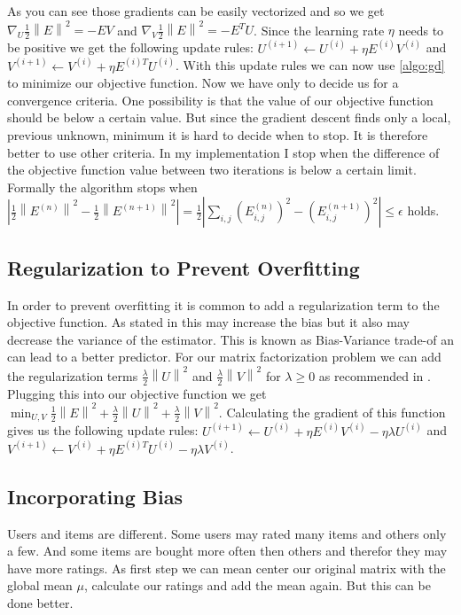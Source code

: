 \documentclass[DIV=14,twocolumn]{scrartcl}
\newcommand{\norm}[1]{\left\lVert#1\right\rVert}
\begin{document}
As you can see those gradients can be easily vectorized and so we get $\nabla_U \frac{1}{2}\norm{E}^2=-EV$ and  $\nabla_V \frac{1}{2}\norm{E}^2=-E^TU$. Since the learning rate $\eta$ needs to be positive we get the following update rules: $U^{(i+1)} \leftarrow U^{(i)} + \eta E^{(i)}V^{(i)}$ and $V^{(i+1)} \leftarrow V^{(i)} + \eta E^{(i)T}U^{(i)}$. With this update rules we can now use \ref{algo:gd} to minimize our objective function. Now we have only to decide us for a convergence criteria. One possibility is that the value of our objective function should be below a certain value. But since the gradient descent finds only a local, previous unknown, minimum it is hard to decide when to stop. It is therefore better to use other criteria. In my implementation I stop when the difference of the objective function value between two iterations is below a certain limit. Formally the algorithm stops when $|\frac{1}{2}\norm{E^{(n)}}^2-\frac{1}{2}\norm{E^{(n+1)}}^2|=\frac{1}{2}|\sum_{i,j}(E_{i,j}^{(n)})^2-(E_{i,j}^{(n+1)})^2|\leq\epsilon$ holds.

\subsection{Regularization to Prevent Overfitting}
In order to prevent overfitting it is common to add a regularization term to the objective function. As stated in \cite{Gi19} this may increase the bias but it also may decrease the variance of the estimator. This is known as Bias-Variance trade-of an can lead to a better predictor. For our matrix factorization problem we can  add the regularization terms $\frac{\lambda}{2}\norm{U}^2$ and $\frac{\lambda}{2}\norm{V}^2$ for $\lambda \geq 0$ as recommended in \cite{Ag16}.
Plugging this into our objective function we get $\min_{U,V} \frac{1}{2}\norm{E}^2 + \frac{\lambda}{2}\norm{U}^2 + \frac{\lambda}{2}\norm{V}^2$. Calculating the gradient of this function gives us the following update rules: $U^{(i+1)} \leftarrow U^{(i)} + \eta E^{(i)}V^{(i)} - \eta\lambda U^{(i)}$ and $V^{(i+1)} \leftarrow V^{(i)} + \eta E^{(i)T}U^{(i)} - \eta\lambda V^{(i)}$.

\subsection{Incorporating Bias}
Users and items are different. Some users may rated many items and others only a few. And some items are bought more often then others and therefor they may have more ratings. 
As first step we can mean center our original matrix with the global mean $\mu$, calculate our ratings and add the mean again. But this can be done better.
\end{document}
